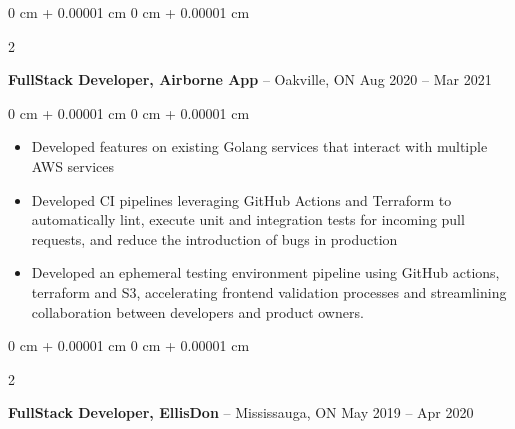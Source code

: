 \documentclass[11pt, letterpaper]{article}
\newenvironment{highlights}{
    \begin{itemize}[
        topsep=0.10 cm,
        parsep=0.10 cm,
        partopsep=0pt,
        itemsep=0pt,
        leftmargin=0 cm + 10pt
    ]
}{
    \end{itemize}
} %
\newenvironment{onecolentry}{
    \begin{adjustwidth}{
        0 cm + 0.00001 cm
    }{
        0 cm + 0.00001 cm
    }
}{
    \end{adjustwidth}
} %
\newenvironment{twocolentry}[2][]{
    \onecolentry
    \def\secondColumn{#2}
    \setcolumnwidth{\fill, 4.5 cm}
    \begin{paracol}{2}
}{
    \switchcolumn \raggedleft \secondColumn
    \end{paracol}
    \endonecolentry
} %
\begin{document}
        \vspace{0.2 cm}

        \begin{twocolentry}{
            Aug 2020 – Mar 2021
        }
            \textbf{FullStack Developer, Airborne App}  -- Oakville, ON\end{twocolentry}

        \vspace{0.10 cm}
        \begin{onecolentry}
            \begin{highlights}
                \item Developed features on existing Golang services that interact with multiple AWS services
                \item Developed CI pipelines leveraging GitHub Actions and Terraform to automatically lint, execute unit and integration tests for incoming pull requests, and reduce the introduction of bugs in production
                \item Developed an ephemeral testing environment pipeline using GitHub actions, terraform and S3, accelerating frontend validation processes and streamlining collaboration between developers and product owners.
            \end{highlights}
        \end{onecolentry}



        \vspace{0.2 cm}

        \begin{twocolentry}{
            May 2019 – Apr 2020
        }
            \textbf{FullStack Developer, EllisDon}  -- Mississauga, ON\end{twocolentry}
\end{document}
